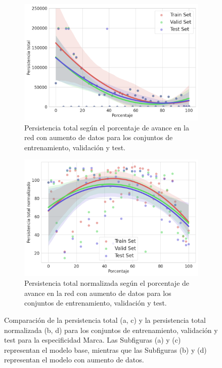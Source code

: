 \begin{figure}[H]
\begin{subfigure}{.45\textwidth}
		\includegraphics[width=\linewidth]{img/m_set_trans.png}
		\caption{Persistencia total según el porcentaje de avance en la red con aumento de datos para los conjuntos de entrenamiento, validación y test.}
		\label{fig:m_set_trans}
	\end{subfigure}%
	\begin{subfigure}{.45\textwidth}
		\centering
		\includegraphics[width=\linewidth]{img/m_set_trans_norm.png}
		\caption{Persistencia total normalizada según el porcentaje de avance en la red con aumento de datos para los conjuntos de entrenamiento, validación y test.}
		\label{fig:m_set_trans_norm}
	\end{subfigure}
	\caption{Comparación de la persistencia total (a, c) y la persistencia total normalizada (b, d) para los conjuntos de entrenamiento, validación y test para la especificidad Marca. Las Subfiguras (a) y (c) representan el modelo base, mientras que las Subfiguras (b) y (d) representan el modelo con aumento de datos.}
	\label{fig:m-set}
\end{figure}

